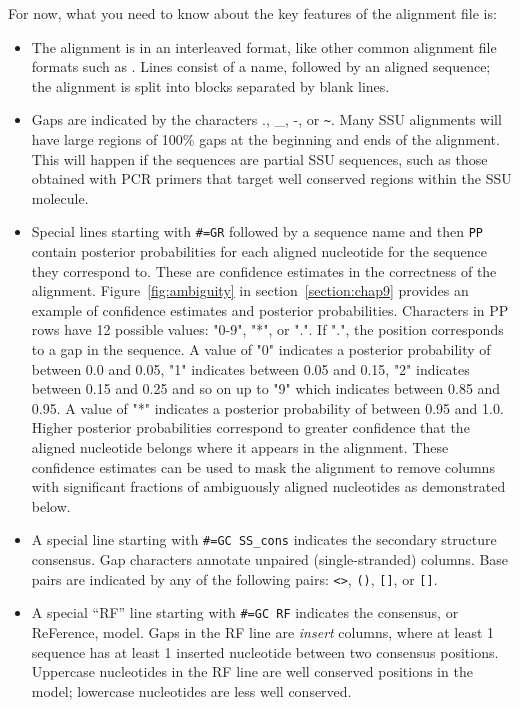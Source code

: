 For now, what you need to know about the key features of the alignment file is:
\begin{itemize}

\item The alignment is in an interleaved format, like other
  common alignment file formats such as .
  Lines consist of a name, followed by an aligned sequence;
  the alignment is split into blocks separated by blank lines.

\item Gaps are indicated by the characters ., \_, -, or \verb+~+.
  Many SSU alignments will have large regions of 100\% gaps at the
  beginning and ends of the alignment. 
  This will happen if the sequences are 
  partial SSU sequences, such as those  obtained with PCR
  primers that target well conserved regions within the SSU
  molecule.

\item Special lines starting with {\small\verb+#=GR+} followed by a
  sequence name and then {\small\verb+PP+} contain posterior
  probabilities for each aligned nucleotide for the sequence they
  correspond to.  These are confidence estimates in the correctness of
  the alignment.  Figure~\ref{fig:ambiguity} in
  section~\ref{section:chap9} provides an example of confidence
  estimates and posterior probabilities.  Characters in PP rows have
  12 possible values: "0-9", "*", or ".". If ".", the position
  corresponds to a gap in the sequence. A value of "0" indicates a
  posterior probability of between 0.0 and 0.05, "1" indicates between
  0.05 and 0.15, "2" indicates between 0.15 and 0.25 and so on up to
  "9" which indicates between 0.85 and 0.95. A value of "*" indicates
  a posterior probability of between 0.95 and 1.0. Higher posterior
  probabilities correspond to greater confidence that the aligned
  nucleotide belongs where it appears in the alignment.  These
  confidence estimates can be used to mask the alignment to remove
  columns with significant fractions of ambiguously aligned nucleotides
  as demonstrated below.

\item A special line starting with {\small\verb+#=GC SS_cons+}
  indicates the secondary structure consensus. Gap characters annotate
  unpaired (single-stranded) columns. Base pairs are indicated by any
  of the following pairs: \verb+<>+, \verb+()+, \verb+[]+, or
  \verb+[]+.

\item A special ``RF'' line starting with {\small\verb+#=GC RF+}
  indicates the consensus, or ReFerence, model. Gaps in the RF line
  are \emph{insert} columns, where at least 1 sequence has at least 1
  inserted nucleotide between two consensus positions. Uppercase nucleotides
  in the RF line are well conserved positions in the model; lowercase
  nucleotides are less well conserved.
\end{itemize}

